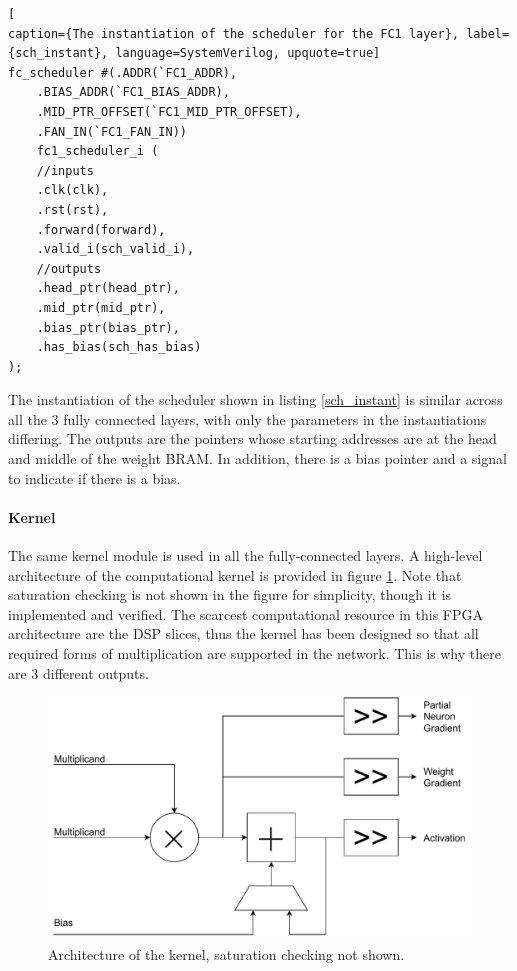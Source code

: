 \begin{lstlisting}[
caption={The instantiation of the scheduler for the FC1 layer}, label={sch_instant}, language=SystemVerilog, upquote=true]
fc_scheduler #(.ADDR(`FC1_ADDR), 
	.BIAS_ADDR(`FC1_BIAS_ADDR),
	.MID_PTR_OFFSET(`FC1_MID_PTR_OFFSET), 
	.FAN_IN(`FC1_FAN_IN)) 
	fc1_scheduler_i (
	//inputs
	.clk(clk),
	.rst(rst),
	.forward(forward),
	.valid_i(sch_valid_i),	
	//outputs
	.head_ptr(head_ptr),
	.mid_ptr(mid_ptr),
	.bias_ptr(bias_ptr),
	.has_bias(sch_has_bias)
);		
\end{lstlisting}
The instantiation of the scheduler shown in listing \ref{sch_instant} is similar across all the 3 fully connected layers, with only the parameters in the instantiations differing. The outputs are the pointers whose starting addresses are at the head and middle of the weight BRAM. In addition, there is a bias pointer and a signal to indicate if there is a bias.


\paragraph{Kernel}
The same kernel module is used in all the fully-connected layers. A high-level architecture of the computational kernel is provided in figure \ref{kernel-arch}. Note that saturation checking is not shown in the figure for simplicity, though it is implemented and verified. The scarcest computational resource in this FPGA architecture are the DSP slices, thus the kernel has been designed so that all required forms of multiplication are supported in the network. This is why there are 3 different outputs.

\begin{figure}
	\centering 
	\includegraphics[width=5in]{figures/kernel_arch}
	\caption{Architecture of the kernel, saturation checking not shown.}\label{kernel-arch}
\end{figure}

